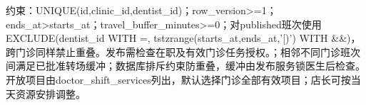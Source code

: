 \documentclass[UTF8,12pt,a4paper,fontset=none]{ctexart}
\begin{document}
约束：UNIQUE(\allowbreak{}id,\allowbreak{}clinic\_\allowbreak{}id,\allowbreak{}dentist\_\allowbreak{}id)\allowbreak{}；row\_\allowbreak{}version>\allowbreak{}=\allowbreak{}1；ends\_\allowbreak{}at>\allowbreak{}starts\_\allowbreak{}at；travel\_\allowbreak{}buffer\_\allowbreak{}minutes>\allowbreak{}=\allowbreak{}0；对published班次使用EXCLUDE(\allowbreak{}dentist\_\allowbreak{}id WITH =\allowbreak{},\allowbreak{} tstzrange(\allowbreak{}starts\_\allowbreak{}at,\allowbreak{}ends\_\allowbreak{}at,\allowbreak{}'[)\allowbreak{}')\allowbreak{} WITH \&\&)\allowbreak{}，跨门诊同样禁止重叠。发布需检查在职及有效门诊任务授权。；相邻不同门诊班次间满足已批准转场缓冲；数据库排斥约束防重叠，缓冲由发布服务锁医生后检查。开放项目由doctor\_\allowbreak{}shift\_\allowbreak{}services列出，默认选择门诊全部有效项目；店长可按当天资源安排调整。\par
\Needspace{216pt}
\end{document}
